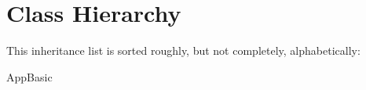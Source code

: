 \section{Class Hierarchy}
This inheritance list is sorted roughly, but not completely, alphabetically\-:\begin{DoxyCompactList}
\item App\-Basic\begin{DoxyCompactList}
\item {}
\end{DoxyCompactList}
\end{DoxyCompactList}
